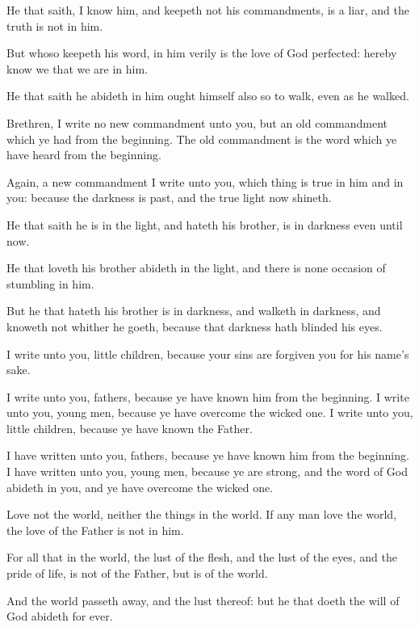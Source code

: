 {He that
saith, I
know
him,
and
keepeth
not
his
commandments,
is a
liar,
and the
truth
is
not
in
him.

But
whoso
keepeth
his
word,
in
him
verily
is the
love of
God
perfected:
hereby know
we
that
we
are
in
him.

He that
saith he
abideth
in
him
ought
himself also
so to
walk,
even
as
he
walked.


\par }{\PP {}Brethren, I
write
no
new
commandment unto
you,
but
an
old
commandment
which ye
had
from the
beginning.
The
old
commandment
is the
word
which ye have
heard
from the
beginning.

Again,
a
new
commandment I
write unto
you, which
thing
is
true
in
him
and
in
you:
because the
darkness is
past,
and
the
true
light
now
shineth.

He that
saith he
is
in the
light,
and
hateth
his
brother,
is
in
darkness even
until
now.

He that
loveth
his
brother
abideth
in the
light,
and there
is
none occasion of
stumbling
in
him.

But he that
hateth
his
brother
is
in
darkness,
and
walketh
in
darkness,
and
knoweth
not
whither he
goeth,
because that
darkness hath
blinded
his
eyes.

I
write unto
you, little
children,
because
your
sins are forgiven
you
for
his
name’s
sake.

I
write unto
you,
fathers,
because ye have
known him
{}
from the
beginning. I
write unto
you, young
men,
because ye have
overcome the wicked
one. I
write unto
you, little
children,
because ye have
known the
Father.

I have
written unto
you,
fathers,
because ye have
known him
{}
from the
beginning. I have
written unto
you, young
men,
because ye
are
strong,
and the
word
of
God
abideth in
you,
and ye have
overcome the wicked
one.

Love
not the
world,
neither the
things
{}
in the
world.
If any
man
love the
world, the
love
of the
Father
is
not
in
him.

For all
that
{}
in the
world, the
lust of the
flesh,
and the
lust of the
eyes,
and the
pride of
life,
is
not
of the
Father,
but
is
of the
world.

And the
world passeth
away,
and the
lust
thereof:
but he that
doeth the
will of
God
abideth
for
ever.


}
